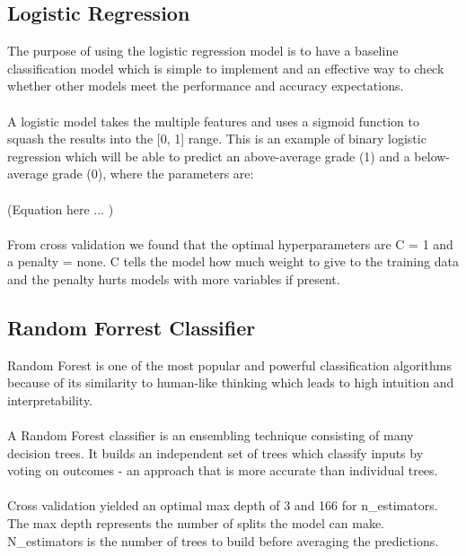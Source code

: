 \documentclass[twoside,twocolumn]{article}
\begin{document}
\subsection{Logistic Regression}
The purpose of using the logistic regression model is to have a baseline classification model which is simple to implement and an effective way to check whether other models meet the performance and accuracy expectations.
\\ \\
A logistic model takes the multiple features and uses a sigmoid function to squash the results into the [0, 1] range. This is an example of binary logistic regression which will be able to predict an above-average grade (1) and a below-average grade (0), where the parameters are:
\\ \\
(Equation here ... )
\\ \\
From cross validation we found that the optimal hyperparameters are C = 1 and a penalty = none. C tells the model how much weight to give to the training data and the penalty hurts models with more variables if present.

\subsection{Random Forrest Classifier}
Random Forest is one of the most popular and powerful classification algorithms because of its similarity to human-like thinking which leads to high intuition and interpretability.
\\ \\
A Random Forest classifier is an ensembling technique consisting of many decision trees. It builds an independent set of trees which classify inputs by voting on outcomes - an approach that is more accurate than individual trees. 
\\ \\
Cross validation yielded an optimal max depth of 3 and 166 for n\_estimators. The max depth represents the number of splits the model can make. N\_estimators is the number of trees to build before averaging the predictions. 
\end{document}
